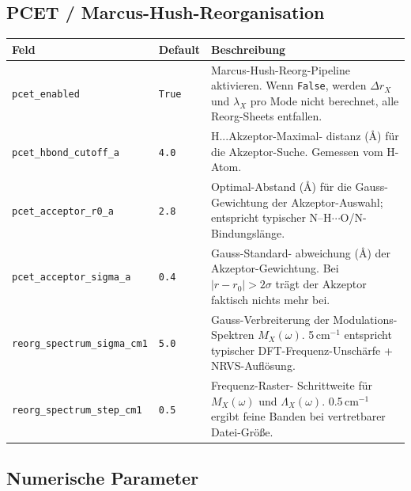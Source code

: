 \documentclass[11pt,a4paper,twoside]{article}
\theoremstyle{remark}
\begin{document}
\subsection{PCET / Marcus-Hush-Reorganisation}

\begin{longtable}{p{} p{} p{}}
\toprule
\textbf{Feld} & \textbf{Default} & \textbf{Beschreibung} \\
\midrule
\endhead
\texttt{pcet\_enabled} & \texttt{True} & Marcus-Hush-Reorg-Pipeline
  aktivieren. Wenn \texttt{False}, werden $\Delta r_X$ und $\lambda_X$
  pro Mode nicht berechnet, alle Reorg-Sheets entfallen. \\
\texttt{pcet\_hbond\_cutoff\_a} & \texttt{4.0} & H...Akzeptor-Maximal-
  distanz (\AA{}) f\"ur die Akzeptor-Suche. Gemessen vom H-Atom. \\
\texttt{pcet\_acceptor\_r0\_a} & \texttt{2.8} & Optimal-Abstand
  (\AA{}) f\"ur die Gauss-Gewichtung der Akzeptor-Auswahl;
  entspricht typischer N--H$\cdots$O/N-Bindungsl\"ange. \\
\texttt{pcet\_acceptor\_sigma\_a} & \texttt{0.4} & Gauss-Standard-
  abweichung (\AA{}) der Akzeptor-Gewichtung. Bei
  $|r - r_0| > 2\sigma$ tr\"agt der Akzeptor faktisch nichts mehr bei. \\
\texttt{reorg\_spectrum\_sigma\_cm1} & \texttt{5.0} & Gauss-Verbreiterung
  der Modulations-Spektren $M_X(\omega)$. 5\,cm$^{-1}$ entspricht
  typischer DFT-Frequenz-Unsch\"arfe + NRVS-Aufl\"osung. \\
\texttt{reorg\_spectrum\_step\_cm1} & \texttt{0.5} & Frequenz-Raster-
  Schrittweite f\"ur $M_X(\omega)$ und $\Lambda_X(\omega)$. 0.5\,cm$^{-1}$
  ergibt feine Banden bei vertretbarer Datei-Gr\"o{\ss}e. \\
\bottomrule
\end{longtable}

\subsection{Numerische Parameter}
\end{document}

